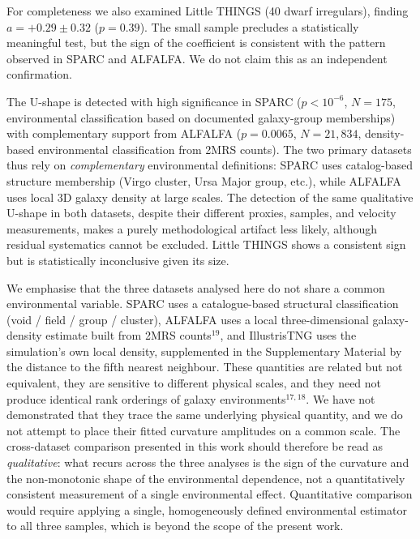 \documentclass[11pt,a4paper]{article}
\begin{document}
For completeness we also examined Little THINGS (40 dwarf irregulars), finding $a = +0.29 \pm 0.32$ ($p = 0.39$). The small sample precludes a statistically meaningful test, but the sign of the coefficient is consistent with the pattern observed in SPARC and ALFALFA. We do not claim this as an independent confirmation.

The U-shape is detected with high significance in SPARC ($p < 10^{-6}$, $N=175$, environmental classification based on documented galaxy-group memberships) with complementary support from ALFALFA ($p = 0.0065$, $N=21{,}834$, density-based environmental classification from 2MRS counts). The two primary datasets thus rely on \textit{complementary} environmental definitions: SPARC uses catalog-based structure membership (Virgo cluster, Ursa Major group, etc.), while ALFALFA uses local 3D galaxy density at large scales. The detection of the same qualitative U-shape in both datasets, despite their different proxies, samples, and velocity measurements, makes a purely methodological artifact less likely, although residual systematics cannot be excluded. Little THINGS shows a consistent sign but is statistically inconclusive given its size.

We emphasise that the three datasets analysed here do not share a common environmental variable. SPARC uses a catalogue-based structural classification (void / field / group / cluster), ALFALFA uses a local three-dimensional galaxy-density estimate built from 2MRS counts$^{19}$, and IllustrisTNG uses the simulation's own local density, supplemented in the Supplementary Material by the distance to the fifth nearest neighbour. These quantities are related but not equivalent, they are sensitive to different physical scales, and they need not produce identical rank orderings of galaxy environments$^{17,18}$. We have not demonstrated that they trace the same underlying physical quantity, and we do not attempt to place their fitted curvature amplitudes on a common scale. The cross-dataset comparison presented in this work should therefore be read as \textit{qualitative}: what recurs across the three analyses is the sign of the curvature and the non-monotonic shape of the environmental dependence, not a quantitatively consistent measurement of a single environmental effect. Quantitative comparison would require applying a single, homogeneously defined environmental estimator to all three samples, which is beyond the scope of the present work.
\end{document}
